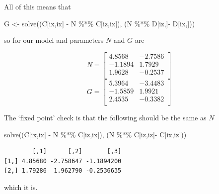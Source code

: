 \documentclass[
  letterpaper,
]{book}
\newenvironment{Shaded}{\begin{snugshade}}{\end{snugshade}}
\newcommand{\FunctionTok}[1]{\textcolor[rgb]{0.28,0.35,0.67}{#1}}
\newcommand{\NormalTok}[1]{\textcolor[rgb]{0.00,0.23,0.31}{#1}}
\newcommand{\OtherTok}[1]{\textcolor[rgb]{0.00,0.23,0.31}{#1}}
\newcommand{\SpecialCharTok}[1]{\textcolor[rgb]{0.37,0.37,0.37}{#1}}
\begin{document}
All of this means that

\begin{Shaded}
\begin{Highlighting}[]
\NormalTok{G }\OtherTok{\textless{}{-}} \FunctionTok{solve}\NormalTok{((C[ix,ix] }\SpecialCharTok{{-}}\NormalTok{ N }\SpecialCharTok{\%*\%}\NormalTok{ C[iz,ix]), (N }\SpecialCharTok{\%*\%}\NormalTok{ D[iz,]}\SpecialCharTok{{-}}\NormalTok{ D[ix,]))}
\end{Highlighting}
\end{Shaded}

so for our model and parameters \(N\) and \(G\) are

\begin{equation}  
  N = \left[\begin{matrix}4.8568 &-2.7586 \\-1.1894 &1.7929 \\1.9628 &-0.2537 \\\end{matrix}\right] 
\end{equation} \begin{equation}
  G = \left[\begin{matrix}5.3964 &-3.4483 \\-1.5859 &1.9921 \\2.4535 &-0.3382 \\\end{matrix}\right] 
\end{equation}

The `fixed point' check is that the following should be the same as
\(N\)

\begin{Shaded}
\begin{Highlighting}[]
\FunctionTok{solve}\NormalTok{((C[ix,ix] }\SpecialCharTok{{-}}\NormalTok{ N }\SpecialCharTok{\%*\%}\NormalTok{ C[iz,ix]), (N }\SpecialCharTok{\%*\%}\NormalTok{ C[iz,iz]}\SpecialCharTok{{-}}\NormalTok{ C[ix,iz]))}
\end{Highlighting}
\end{Shaded}

\begin{verbatim}
        [,1]      [,2]       [,3]
[1,] 4.85680 -2.758647 -1.1894200
[2,] 1.79286  1.962790 -0.2536635
\end{verbatim}

which it is.
\end{document}
